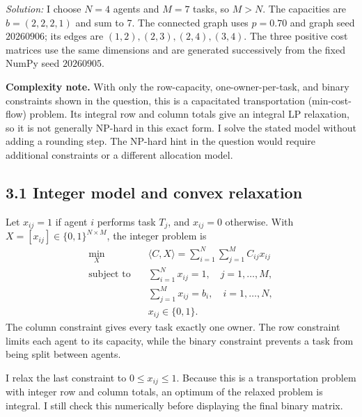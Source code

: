 \documentclass[a4paper,11pt]{article}
\newenvironment{solution}{\textit{Solution:}}{}
\begin{document}
\begin{solution}
I choose $N=4$ agents and $M=7$ tasks, so $M>N$. The capacities are
$b=(2,2,2,1)$ and sum to 7. The connected graph uses $p=0.70$ and graph seed $20260906$;
its edges are $(1,2),(2,3),(2,4),(3,4)$. The three positive cost matrices use the same dimensions
and are generated successively from the fixed NumPy seed $20260905$.

\textbf{Complexity note.} With only the row-capacity, one-owner-per-task, and binary constraints
shown in the question, this is a capacitated transportation (min-cost-flow) problem. Its integral
row and column totals give an integral LP relaxation, so it is not generally NP-hard in this exact
form. I solve the stated model without adding a rounding step. The NP-hard hint in the question
would require additional constraints or a different allocation model.

\subsection*{3.1 Integer model and convex relaxation}
Let $x_{ij}=1$ if agent $i$ performs task $T_j$, and $x_{ij}=0$ otherwise. With
$X=[x_{ij}]\in\{0,1\}^{N\times M}$, the integer problem is
\[
\begin{aligned}
\min_X\quad &\langle C,X\rangle=\sum_{i=1}^N\sum_{j=1}^M C_{ij}x_{ij}\\
\text{subject to}\quad &\sum_{i=1}^N x_{ij}=1,\quad j=1,\ldots,M,\\
&\sum_{j=1}^M x_{ij}=b_i,\quad i=1,\ldots,N,\\
&x_{ij}\in\{0,1\}.
\end{aligned}
\]
The column constraint gives every task exactly one owner. The row constraint limits each agent to
its capacity, while the binary constraint prevents a task from being split between agents.

I relax the last constraint to $0\le x_{ij}\le1$. Because this is a transportation problem with
integer row and column totals, an optimum of the relaxed problem is integral. I still check this
numerically before displaying the final binary matrix.


\end{solution}
\end{document}
